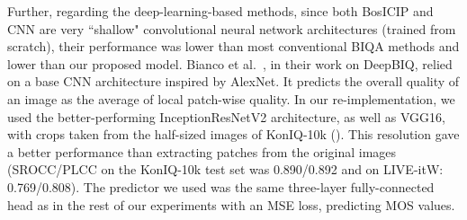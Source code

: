 \documentclass[10pt,journal,compsoc]{IEEEtran}
\begin{document}
Further, regarding the deep-learning-based methods, since both BosICIP and CNN are very ``shallow" convolutional neural network architectures (trained from scratch), their performance was lower than most conventional BIQA methods and lower than our proposed model.
Bianco et al.\ \cite{bianco2018use}, in their work on DeepBIQ, relied on a base CNN architecture inspired by AlexNet. It predicts the overall quality of an image as the average of local patch-wise quality. In our re-implementation, we used the better-performing InceptionResNetV2 architecture, as well as VGG16, with  crops taken from the half-sized images of KonIQ-10k (). This resolution gave a better performance than extracting patches from the original images (SROCC/PLCC on the KonIQ-10k test set was 0.890/0.892 and on LIVE-itW: 0.769/0.808). The predictor we used was the same three-layer fully-connected head as in the rest of our experiments with an MSE loss, predicting MOS values.
\end{document}
